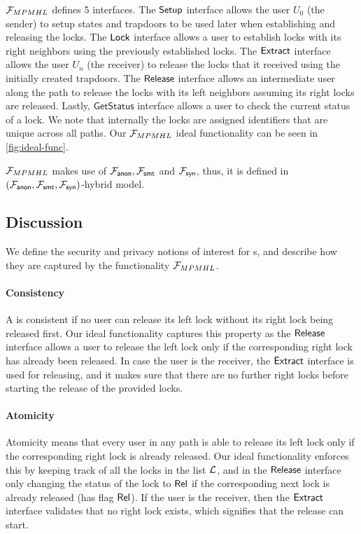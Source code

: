 $\mathcal{F}_{MPMHL}$ defines 5 interfaces. The $\mathsf{Setup}$ interface allows the user $U_0$ (the sender) 
to setup states and trapdoors to be used later when establishing and releasing the locks. The $\mathsf{Lock}$ 
interface allows a user to establish locks with its right neighbors using the previously established 
locks. The $\mathsf{Extract}$ interface allows the user $U_n$ (the receiver) to release the locks that it 
received using the initially created trapdoors. The $\mathsf{Release}$ interface allows an intermediate user 
along the path to release the locks with its left neighbors assuming its right locks are released. 
Lastly, $\mathsf{GetStatus}$ interface allows a user to check the current status of a lock. We note 
that internally the locks are assigned identifiers that are unique across all paths. Our $\mathcal{F}_{MPMHL}$ 
ideal functionality can be seen in \cref{fig:ideal-func}.

$\mathcal{F}_{MPMHL}$ makes use of $\mathcal{F}_{\mathsf{anon}}, \mathcal{F}_{\mathsf{smt}}$ and $\mathcal{F}_{\mathsf{syn}}$, thus, it is defined in 
$(\mathcal{F}_{\mathsf{anon}}, \mathcal{F}_{\mathsf{smt}}, \mathcal{F}_{\mathsf{syn}})$-hybrid model.

\subsection{Discussion}

We define the security and privacy notions of interest for {\sysname}s, and describe how they 
are captured by the functionality $\mathcal{F}_{MPMHL}$.

\paragraph{Consistency} A \sysname is consistent if no user can release its left lock without its 
right lock being released first. Our ideal functionality captures this property as the $\mathsf{Release}$ 
interface allows a user to release the left lock only if the corresponding right lock has already 
been released. In case the user is the receiver, the $\mathsf{Extract}$ interface is used for releasing, 
and it makes sure that there are no further right locks before starting the release of the provided 
locks. 

\paragraph{Atomicity} Atomicity means that every user in any path is able to release its left lock 
only if the corresponding right lock is already released. Our ideal functionality enforces this by 
keeping track of all the locks in the list $\mathcal{L}$, and in the $\mathsf{Release}$ interface only changing the 
status of the lock to $\mathsf{Rel}$ if the corresponding next lock is already released (has flag $\mathsf{Rel}$). 
If the user is the receiver, then the $\mathsf{Extract}$ interface validates that no right lock exists, which 
signifies that the release can start.

